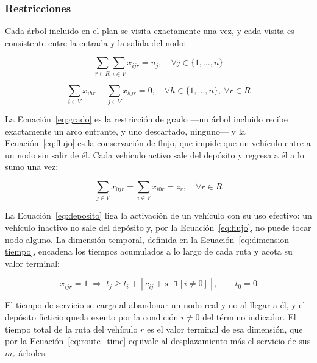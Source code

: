 \subsubsection*{Restricciones}

Cada árbol incluido en el plan se visita exactamente una vez, y cada visita es
consistente entre la entrada y la salida del nodo:

\begin{equation}
  \sum_{r \in R} \sum_{i \in V} x_{ijr} = u_j, \quad \forall j \in \{1,\ldots,n\}
  \label{eq:grado}
\end{equation}

\begin{equation}
  \sum_{i \in V} x_{ihr} - \sum_{j \in V} x_{hjr} = 0,
  \quad \forall h \in \{1,\ldots,n\},\ \forall r \in R
  \label{eq:flujo}
\end{equation}

La Ecuación~\ref{eq:grado} es la restricción de grado ---un árbol incluido recibe
exactamente un arco entrante, y uno descartado, ninguno--- y la
Ecuación~\ref{eq:flujo} es la conservación de flujo, que impide que un vehículo
entre a un nodo sin salir de él. Cada vehículo activo sale del depósito y regresa a
él a lo sumo una vez:

\begin{equation}
  \sum_{j \in V} x_{0jr} = \sum_{i \in V} x_{i0r} = z_r, \quad \forall r \in R
  \label{eq:deposito}
\end{equation}

La Ecuación~\ref{eq:deposito} liga la activación de un vehículo con su uso efectivo:
un vehículo inactivo no sale del depósito y, por la Ecuación~\ref{eq:flujo}, no puede
tocar nodo alguno. La dimensión temporal, definida en la
Ecuación~\ref{eq:dimension-tiempo}, encadena los tiempos acumulados a lo largo de cada
ruta y acota su valor terminal:

\begin{equation}
  x_{ijr} = 1 \;\Longrightarrow\; t_j \geq t_i + \left\lceil c_{ij} + s\cdot\mathbf{1}[i \neq 0] \right\rceil,
  \qquad t_0 = 0
  \label{eq:dimension-tiempo}
\end{equation}

El tiempo de servicio se carga al abandonar un nodo real y no al llegar a él, y el
depósito ficticio queda exento por la condición $i \neq 0$ del término indicador. El
tiempo total de la ruta del vehículo $r$ es el valor terminal de esa dimensión, que
por la Ecuación~\ref{eq:route_time} equivale al desplazamiento más el servicio de sus
$m_r$ árboles:

